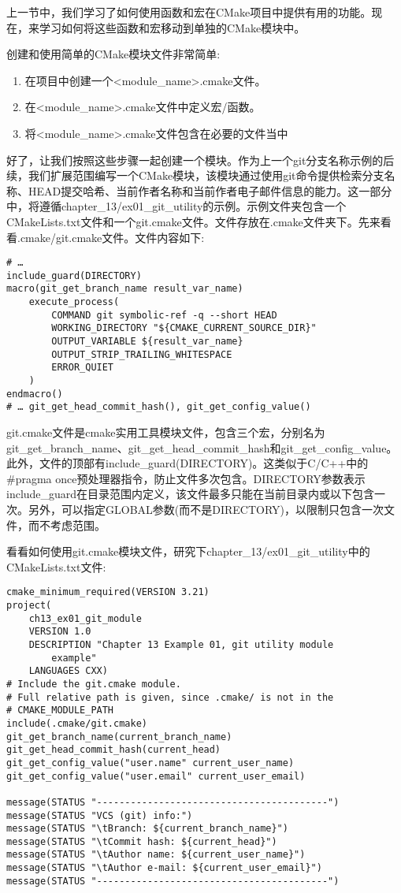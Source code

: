 
上一节中，我们学习了如何使用函数和宏在CMake项目中提供有用的功能。现在，来学习如何将这些函数和宏移动到单独的CMake模块中。

创建和使用简单的CMake模块文件非常简单:

\begin{enumerate}
\item 
在项目中创建一个<module\_name>.cmake文件。

\item 
在<module\_name>.cmake文件中定义宏/函数。

\item 
将<module\_name>.cmake文件包含在必要的文件当中
\end{enumerate}

好了，让我们按照这些步骤一起创建一个模块。作为上一个git分支名称示例的后续，我们扩展范围编写一个CMake模块，该模块通过使用git命令提供检索分支名称、HEAD提交哈希、当前作者名称和当前作者电子邮件信息的能力。这一部分中，将遵循chapter\_13/ex01\_git\_utility的示例。示例文件夹包含一个CMakeLists.txt文件和一个git.cmake文件。文件存放在.cmake文件夹下。先来看看.cmake/git.cmake文件。文件内容如下:

\begin{lstlisting}[style=styleCMake]
# …
include_guard(DIRECTORY)
macro(git_get_branch_name result_var_name)
	execute_process(
		COMMAND git symbolic-ref -q --short HEAD
		WORKING_DIRECTORY "${CMAKE_CURRENT_SOURCE_DIR}"
		OUTPUT_VARIABLE ${result_var_name}
		OUTPUT_STRIP_TRAILING_WHITESPACE
		ERROR_QUIET
	)
endmacro()
# … git_get_head_commit_hash(), git_get_config_value()
\end{lstlisting}

git.cmake文件是cmake实用工具模块文件，包含三个宏，分别名为git\_get\_branch\_name、git\_get\_head\_commit\_hash和git\_get\_config\_value。此外，文件的顶部有include\_guard(DIRECTORY)。这类似于C/C++中的\#pragma once预处理器指令，防止文件多次包含。DIRECTORY参数表示include\_guard在目录范围内定义，该文件最多只能在当前目录内或以下包含一次。另外，可以指定GLOBAL参数(而不是DIRECTORY)，以限制只包含一次文件，而不考虑范围。

看看如何使用git.cmake模块文件，研究下chapter\_13/ex01\_git\_utility中的CMakeLists.txt文件:

\begin{lstlisting}[style=styleCMake]
cmake_minimum_required(VERSION 3.21)
project(
	ch13_ex01_git_module
	VERSION 1.0
	DESCRIPTION "Chapter 13 Example 01, git utility module
		example"
	LANGUAGES CXX)
# Include the git.cmake module.
# Full relative path is given, since .cmake/ is not in the 
# CMAKE_MODULE_PATH
include(.cmake/git.cmake)
git_get_branch_name(current_branch_name)
git_get_head_commit_hash(current_head)
git_get_config_value("user.name" current_user_name)
git_get_config_value("user.email" current_user_email)

message(STATUS "-----------------------------------------")
message(STATUS "VCS (git) info:")
message(STATUS "\tBranch: ${current_branch_name}")
message(STATUS "\tCommit hash: ${current_head}")
message(STATUS "\tAuthor name: ${current_user_name}")
message(STATUS "\tAuthor e-mail: ${current_user_email}")
message(STATUS "-----------------------------------------")
\end{lstlisting}

